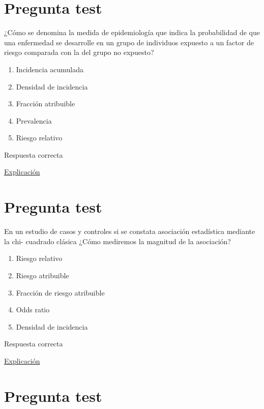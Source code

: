 \documentclass[
]{book}
\providecommand{\tightlist}{%
  \setlength{\itemsep}{0pt}\setlength{\parskip}{0pt}}
\begin{document}
\hypertarget{pregunta-test-138}{%
\section{Pregunta test}\label{pregunta-test-138}}

¿Cómo se denomina la medida de epidemiología que indica la probabilidad de que una enfermedad se desarrolle en un grupo de individuos expuesto a un factor de riesgo comparada con la del grupo no expuesto?

\begin{enumerate}
\def\labelenumi{\alph{enumi})}
\tightlist
\item
  Incidencia acumulada
\item
  Densidad de incidencia
\item
  Fracción atribuible
\item
  Prevalencia
\item
  Riesgo relativo
\end{enumerate}

Respuesta correcta

\href{https://es.wikipedia.org/wiki/Riesgo_relativo}{Explicación}

\hypertarget{pregunta-test-139}{%
\section{Pregunta test}\label{pregunta-test-139}}

En un estudio de casos y controles si se constata asociación estadística mediante la chi- cuadrado clásica ¿Cómo mediremos la magnitud de la asociación?

\begin{enumerate}
\def\labelenumi{\alph{enumi})}
\tightlist
\item
  Riesgo relativo
\item
  Riesgo atribuible
\item
  Fracción de riesgo atribuible
\item
  Odds ratio
\item
  Densidad de incidencia
\end{enumerate}

Respuesta correcta

\href{https://www.elsevier.es/es-revista-educacion-medica-71-articulo-el-odds-ratio-su-interpretacion-S1575181317300360}{Explicación}

\hypertarget{pregunta-test-140}{%
\section{Pregunta test}\label{pregunta-test-140}}
\end{document}
